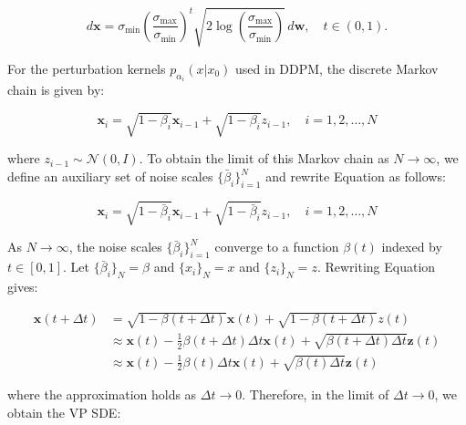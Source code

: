 \begin{equation}
    d \mathbf{x} = \sigma_{\min} \left( \frac{\sigma_{\max}}{\sigma_{\min}} \right) ^t \sqrt{2 \log \left( \frac{\sigma_{\max}}{\sigma_{\min}} \right) } \, d \mathbf{w}, \quad t \in (0, 1).
\end{equation}

\noindent
For the perturbation kernels \( p_{\alpha_i}(x | x_0) \) used in DDPM, the discrete Markov chain is given by:

\begin{equation}
\mathbf{x}_i = \sqrt{1 - \beta_i} \mathbf{x}_{i-1} + \sqrt{1 - \beta_i} z_{i-1}, \quad i = 1, 2, \ldots, N \label{eq:ddpm-discrete}
\end{equation}

\noindent
where \( z_{i-1} \sim \mathcal{N}(0, I) \). To obtain the limit of this Markov chain as \( N \to \infty \), we define an auxiliary set of noise scales \( \{ \bar{\beta}_i \}_{i=1}^N \) and rewrite Equation  as follows:

\begin{equation}
\mathbf{x}_i = \sqrt{1 - \bar{\beta}_i} \mathbf{x}_{i-1} + \sqrt{1 - \bar{\beta}_i} z_{i-1}, \quad i = 1, 2, \ldots, N \label{eq:ddpm-discrete}
\end{equation}

\noindent
As \( N \to \infty \), the noise scales \( \{ \bar{\beta}_i \}_{i=1}^N \) converge to a function \( \beta(t) \) indexed by \( t \in [0, 1] \). Let \( \{ \bar{\beta}_i \}_{N} = \beta \) and \( \{ x_i \}_{N} = x \) and \( \{ z_i \}_{N} = z \). Rewriting Equation  gives:

\begin{equation}
\begin{aligned}
    \mathbf{x}(t + \Delta t) &= \sqrt{1 - \beta(t + \Delta t)} \mathbf{x}(t) + \sqrt{1 - \beta(t + \Delta t)} z(t) \\ &\approx \mathbf{x}(t) -\frac{1}{2}\beta(t + \Delta t) \Delta t \mathbf{x}(t)+\sqrt{\beta(t + \Delta t) \Delta t } \mathbf{z} (t) \\
    &\approx \mathbf{x}(t) -\frac{1}{2}\beta(t ) \Delta t \mathbf{x}(t)+\sqrt{\beta(t ) \Delta t } \mathbf{z} (t) 
\end{aligned} \label{eq:ddpm-discrete}
\end{equation}

\noindent
where the approximation holds as \( \Delta t \to 0 \). Therefore, in the limit of \( \Delta t \to 0 \), we obtain the VP SDE:

